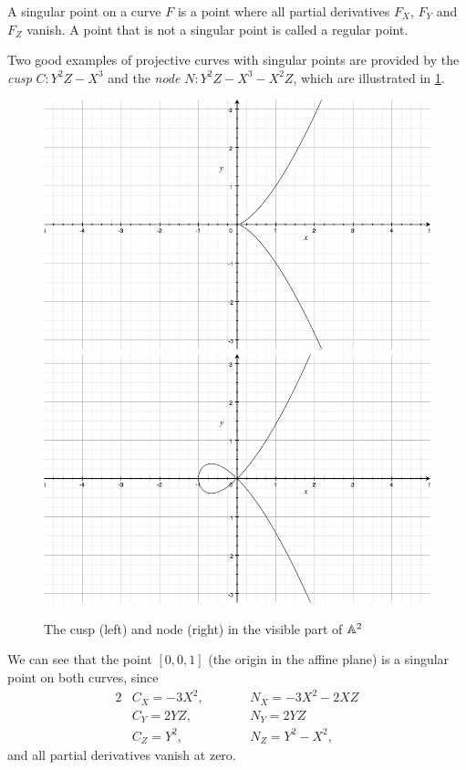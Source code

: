 \begin{definition}
	A singular point on a curve $F$ is a point where all partial derivatives $F_X$, $F_Y$ and $F_Z$ vanish. A point that is not a singular point is called a regular point.
\end{definition}
Two good examples of projective curves with singular points are provided by the \emph{cusp} $C : Y^2Z - X^3$ and the \emph{node} $N : Y^2Z - X^3 - X^2Z$, which are illustrated in \cref{cuspandnode}.
\begin{figure}[htbp]
	\centering
	\includegraphics[scale=0.25]{../Figures/cusp.jpg}
	\includegraphics[scale=0.25]{../Figures/node.jpg}
	\caption{The cusp (left) and node (right) in the visible part of $\an[2]$}
	\label{cuspandnode}
\end{figure}
We can see that the point $[0,0,1]$ (the origin in the affine plane) is a singular point on both curves, since
\begin{alignat*}{2}
	&C_X = -3X^2,\qquad &&N_X = - 3X^2 - 2XZ\\
	&C_Y = 2YZ,\qquad &&N_Y = 2YZ\\
	&C_Z = Y^2,\qquad &&N_Z = Y^2 -X^2,
\end{alignat*}
and all partial derivatives vanish at zero.

